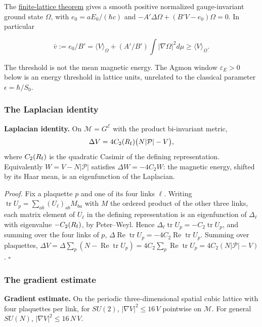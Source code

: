 \documentclass[11pt,a4paper]{article}
\begin{document}
The
\href{mass-gap-obligations-lattice.md\#2-t1-every-finite-lattice-has-a-gap-above-a-unique-physical-ground-state}{finite-lattice
theorem} gives a smooth positive normalized gauge-invariant ground state
\(\Omega\), with \(e_0=aE_0/(\hbar c)\) and
\(-A'\Delta\Omega+(B'V-e_0)\Omega=0\). In particular

\[\bar v:=e_0/B'=\langle V\rangle_\Omega+(A'/B')
 \int|\nabla\Omega|^2d\mu\ge\langle V\rangle_\Omega.\]

The threshold is not the mean magnetic energy. The Agmon window
\(\varepsilon_E>0\) below is an energy threshold in lattice units,
unrelated to the classical parameter \(\epsilon=\hbar/S_0\).

\hypertarget{the-laplacian-identity}{%
\subsubsection{The Laplacian identity}\label{the-laplacian-identity}}

\textbf{Laplacian identity.} On \(\mathcal M=G^{\mathcal E}\) with the
product bi-invariant metric,
\[\Delta V=4C_2(R_{\rm f})\big(N|\mathcal P|-V\big),\] where
\(C_2(R_{\rm f})\) is the quadratic Casimir of the defining
representation. Equivalently \(W=V-N|\mathcal P|\) satisfies
\(\Delta W=-4C_2W\): the magnetic energy, shifted by its Haar mean, is
an eigenfunction of the Laplacian.

\emph{Proof.} Fix a plaquette \(p\) and one of its four links \(\ell\).
Writing \(\operatorname{tr}U_p=\sum_{ab}(U_\ell)_{ab}M_{ba}\) with \(M\)
the ordered product of the other three links, each matrix element of
\(U_\ell\) in the defining representation is an eigenfunction of
\(\Delta_\ell\) with eigenvalue \(-C_2(R_{\rm f})\), by Peter--Weyl.
Hence \(\Delta_\ell\operatorname{tr}U_p=-C_2\operatorname{tr}U_p\), and
summing over the four links of \(p\),
\(\Delta\operatorname{Re}\operatorname{tr}U_p=-4C_2\operatorname{Re}\operatorname{tr}U_p\).
Summing over plaquettes,
\(\Delta V=\Delta\sum_p(N-\operatorname{Re}\operatorname{tr}U_p) =4C_2\sum_p\operatorname{Re}\operatorname{tr}U_p=4C_2(N|\mathcal P|-V)\).
\(\square\)

\hypertarget{the-gradient-estimate}{%
\subsubsection{The gradient estimate}\label{the-gradient-estimate}}

\textbf{Gradient estimate.} On the periodic three-dimensional spatial
cubic lattice with four plaquettes per link, for \(SU(2)\),
\(|\nabla V|^2\le16\,V\) pointwise on \(\mathcal M\). For general
\(SU(N)\), \(|\nabla V|^2\le16\,N\,V\).
\end{document}
